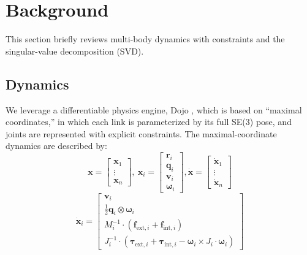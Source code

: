 \section{Background} \label{background}
This section briefly reviews multi-body dynamics with constraints and the singular-value decomposition (SVD).

\subsection{Dynamics} We leverage a differentiable physics engine, Dojo \cite{howell_dojo_2022}, which is based on “maximal coordinates,” in which each link is parameterized by its full SE(3) pose, and joints are represented with explicit constraints. The maximal-coordinate dynamics are described by:
\begin{equation}
\textbf{x} = \begin{bmatrix}
    \textbf{x}_1 \\
    \vdots \\
    \textbf{x}_n
\end{bmatrix}, \ \textbf{x}_i = \begin{bmatrix}
    \textbf{r}_i \\ \textbf{q}_i \\ \textbf{v}_i \\ \boldsymbol{\omega}_i
\end{bmatrix},    \dot{\textbf{x}} = \begin{bmatrix}
    \dot{\textbf{x}}_1 \\ 
    \vdots \\ 
    \dot{\textbf{x}}_n
\end{bmatrix}
\label{eq:space_struct1}
\end{equation}
\begin{equation}
    \dot{\textbf{x}}_i = \begin{bmatrix}
    {\textbf{v}}_i \\ \frac{1}{2}\textbf{q}_i \otimes \boldsymbol{\omega}_i \\ M_i^{-1} \cdot (\textbf{f}_{\text{ext}, i} + \textbf{f}_{\text{int}, i}) \\ J_i^{-1} \cdot (\boldsymbol{\tau}_{\text{ext}, i} + \boldsymbol{\tau}_{\text{int}, i} - \boldsymbol{\omega}_i \times J_i \cdot \boldsymbol{\omega}_i)
\end{bmatrix}  
\end{equation}

